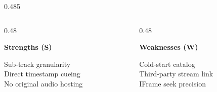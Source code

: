 \begin{frame}[t]
\begin{columns}[onlytextwidth, T]
\begin{column}{0.485\textwidth}
\begin{tcolorbox}[standardcard, top=3.5pt, bottom=3.5pt, left=6pt, right=6pt]
        \begin{columns}[onlytextwidth, T]
          \begin{column}{0.48\textwidth}
            \begin{tcolorbox}[innercard, top=3pt, bottom=3pt, left=3.5pt, right=3.5pt]
              {\scriptsize\bfseries\textcolor{accentemerald}{Strengths (S)}}\par\vspace{0.6mm}
              {\tiny\textbullet{} Sub-track granularity}\\[0.2mm]
              {\tiny\textbullet{} Direct timestamp cueing}\\[0.2mm]
              {\tiny\textbullet{} No original audio hosting}
            \end{tcolorbox}
          \end{column}
          \begin{column}{0.48\textwidth}
            \begin{tcolorbox}[innercard, top=3pt, bottom=3pt, left=3.5pt, right=3.5pt]
              {\scriptsize\bfseries\textcolor{textdim}{Weaknesses (W)}}\par\vspace{0.6mm}
              {\tiny\textbullet{} Cold-start catalog}\\[0.2mm]
              {\tiny\textbullet{} Third-party stream link}\\[0.2mm]
              {\tiny\textbullet{} IFrame seek precision}
            \end{tcolorbox}
          \end{column}
        \end{columns}

        \vspace{1mm}


\end{tcolorbox}
\end{column}
\end{columns}
\end{frame}
